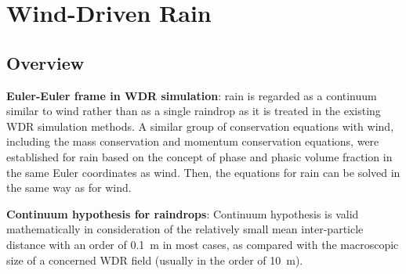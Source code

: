 \chapter{Wind-Driven Rain}

\section{Overview}
\textbf{Euler-Euler frame in WDR simulation}\cite{Huang2011WDR}: 
rain is regarded as a continuum similar to wind rather than as a single raindrop as it is treated in the existing WDR simulation methods. 
A similar group of conservation equations with wind, including the mass conservation and momentum conservation equations, 
were established for rain based on the concept of phase and phasic volume fraction in the same Euler coordinates as wind. 
Then, the equations for rain can be solved in the same way as for wind.

\textbf{Continuum hypothesis for raindrops}\cite{Huang2010WDR}:
Continuum hypothesis is valid mathematically in consideration of the relatively small mean inter-particle distance with an order of \SI{0.1}{m}
in most cases, as compared with the macroscopic size of a concerned WDR field (usually in the order of \SI{10}{m}).

